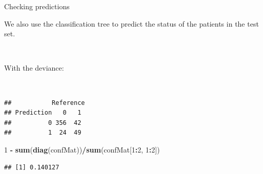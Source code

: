\documentclass[10pt,ignorenonframetext,]{beamer}
\newenvironment{Shaded}{\begin{snugshade}}{\end{snugshade}}
\newcommand{\KeywordTok}[1]{\textcolor[rgb]{0.13,0.29,0.53}{\textbf{#1}}}
\newcommand{\DataTypeTok}[1]{\textcolor[rgb]{0.13,0.29,0.53}{#1}}
\newcommand{\DecValTok}[1]{\textcolor[rgb]{0.00,0.00,0.81}{#1}}
\newcommand{\StringTok}[1]{\textcolor[rgb]{0.31,0.60,0.02}{#1}}
\newcommand{\OperatorTok}[1]{\textcolor[rgb]{0.81,0.36,0.00}{\textbf{#1}}}
\newcommand{\NormalTok}[1]{#1}
\begin{document}
\begin{frame}[fragile]

\begin{block}{Checking predictions}

\vspace{2mm}

We also use the classification tree to predict the status of the
patients in the test set.

\(~\)

With the deviance:

\(~\)

\tiny

\begin{Shaded}
\end{Shaded}

\begin{verbatim}
##           Reference
## Prediction   0   1
##          0 356  42
##          1  24  49
\end{verbatim}

\begin{Shaded}
\begin{Highlighting}[]
\DecValTok{1} \OperatorTok{-}\StringTok{ }\KeywordTok{sum}\NormalTok{(}\KeywordTok{diag}\NormalTok{(confMat))}\OperatorTok{/}\KeywordTok{sum}\NormalTok{(confMat[}\DecValTok{1}\OperatorTok{:}\DecValTok{2}\NormalTok{, }\DecValTok{1}\OperatorTok{:}\DecValTok{2}\NormalTok{])}
\end{Highlighting}
\end{Shaded}

\begin{verbatim}
## [1] 0.140127
\end{verbatim}

\end{block}

\end{frame}
\end{document}
